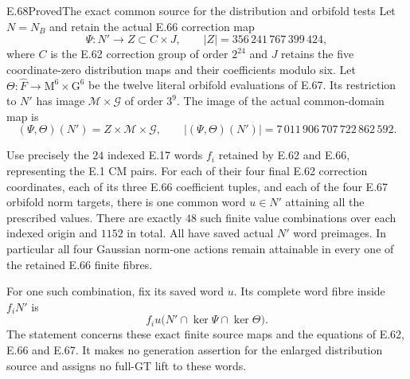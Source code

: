 \begin{statement}{E.68}{Proved}{The exact common source for the distribution and orbifold tests}
Let $N=N_B$ and retain the actual E.66 correction map
\[
 \Psi:N'\longrightarrow Z\subset C\times J,
 \qquad |Z|=356\,241\,767\,399\,424,
 \tag{E.68.1}
\]
where $C$ is the E.62 correction group of order $2^{24}$
and $J$ retains the five coordinate-zero distribution maps
and their coefficients modulo six. Let
$\Theta:\widehat F\to\mathrm M^6\times\mathrm G^6$ be the twelve
literal orbifold evaluations of E.67. Its restriction to
$N'$ has image $\mathcal M\times\mathcal G$ of order $3^9$. The image of the actual common-domain map is
\[
 (\Psi,\Theta)(N')=Z\times\mathcal M\times\mathcal G,
 \qquad
 |(\Psi,\Theta)(N')|=7\,011\,906\,707\,722\,862\,592.
 \tag{E.68.2}
\]

Use precisely the $24$ indexed E.17 words $f_i$ retained
by E.62 and E.66, representing the E.1 CM pairs. For each
of their four final E.62 correction coordinates, each of
its three E.66 coefficient tuples, and each of the four
E.67 orbifold norm targets, there is one common word
$u\in N'$ attaining all the prescribed values.
There are exactly $48$ such finite value combinations
over each indexed origin and $1152$ in total. All have
saved actual $N'$ word preimages. In particular all four
Gaussian norm-one actions remain attainable in every
one of the retained E.66 finite fibres.

For one such combination, fix its saved word $u$. Its
complete word fibre inside $f_iN'$ is
\[
       f_i u\bigl(N'\cap\ker\Psi\cap\ker\Theta\bigr).
 \tag{E.68.3}
\]
The statement concerns these exact finite source maps
and the equations of E.62, E.66 and E.67. It makes no
generation assertion for the enlarged distribution
source and assigns no full-GT lift to these words.
\end{statement}
